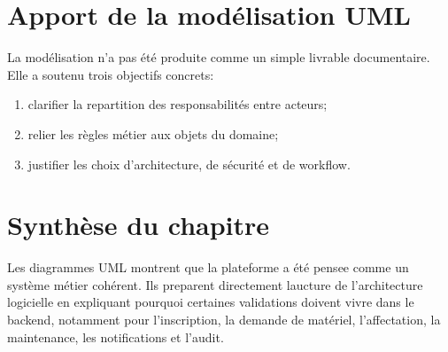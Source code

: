 \section{Apport de la modélisation UML}
La modélisation n'a pas été produite comme un simple livrable documentaire. Elle a soutenu trois objectifs concrets:
\begin{enumerate}
  \item clarifier la repartition des responsabilités entre acteurs;
  \item relier les règles métier aux objets du domaine;
  \item justifier les choix d'architecture, de sécurité et de workflow.
\end{enumerate}

\section{Synthèse du chapitre}
Les diagrammes UML montrent que la plateforme a été pensee comme un système métier cohérent. Ils preparent directement laucture de l'architecture logicielle en expliquant pourquoi certaines validations doivent vivre dans le backend, notamment pour l'inscription, la demande de matériel, l'affectation, la maintenance, les notifications et l'audit.









